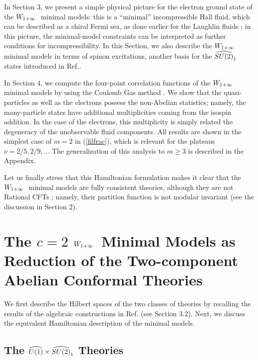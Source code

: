 In Section $3$, we present a simple physical picture for the electron
ground state of the $W_{1+\infty}\ $ minimal models: this is a 
``minimal'' incompressible Hall fluid, which can be described as a 
chiral Fermi sea, 
as done earlier for the Laughlin fluids \cite{ctz1}\cite{sakita}; 
in this picture, the minimal-model constraints can be interpreted 
as further conditions for incompressibility.
In this Section, we also describe the $W_{1+\infty}\ $ minimal models in 
terms of spinon excitations, another basis for the $\su2$ states
introduced in Ref.\cite{spinon}.

In Section $4$, we compute the four-point correlation functions of 
the $W_{1+\infty}\ $ minimal models by using the Coulomb Gas 
method \cite{dofa}. We show that the quasi-particles as well as the
electrons possess the non-Abelian statistics; 
namely, the many-particle states have additional multiplicities
coming from the isospin addition.
In the case of the electrons, this multiplicity is simply related
the degeneracy of the unobservable fluid components.
All results are shown in the simplest case of $m=2$ in
(\ref{filfrac}), which is relevant for the plateaus $\nu=2/5,2/9,\dots$
The generalization of this analysis to $m\ge 3$ is described in
the Appendix.

Let us finally stress that this Hamiltonian formulation makes it clear 
that the $W_{1+\infty}\ $ minimal models are fully consistent theories, although they
are not Rational CFTs \cite{cft}; namely, their partition function is 
not modular invariant \cite{cz} (see the discussion in Section $2$).



\section{The $c=2$ $W_{1+\infty}\ $ Minimal Models as Reduction of the
Two-component Abelian Conformal Theories}

We first describe the Hilbert spaces of the two
classes of theories by recalling the results of the algebraic 
constructions in Ref.\cite{ctz5} 
(see Section $3.2$). Next, we discuss the equivalent Hamiltonian
description of the minimal models. 


\subsection{The $\u1\times\su2$ Theories}

